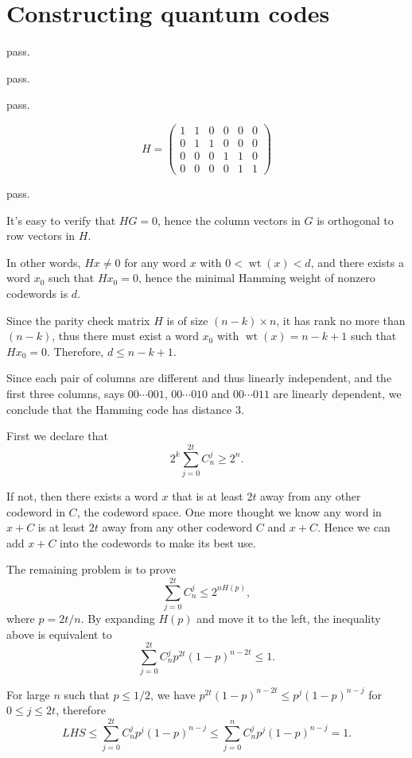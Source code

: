 \section{Constructing quantum codes}

\ex pass.

\ex pass.

\ex pass.

\ex $$H = \begin{pmatrix}
    1 & 1 & 0 & 0 & 0 & 0 \\
    0 & 1 & 1 & 0 & 0 & 0 \\
    0 & 0 & 0 & 1 & 1 & 0 \\
    0 & 0 & 0 & 0 & 1 & 1
\end{pmatrix}$$

\ex pass.

\ex It's easy to verify that $HG=0$, hence the column vectors in $G$ is orthogonal to row vectors in $H$.

\ex In other words, $Hx \neq 0$ for any word $x$ with $0 < \operatorname{wt}(x) < d$, and there exists a word $x_0$ such that $Hx_0=0$, hence the minimal Hamming weight of nonzero codewords is $d$.

\ex Since the parity check matrix $H$ is of size $(n-k)\times n$, it has rank no more than $(n-k)$, thus there must exist a word $x_0$ with $\operatorname{wt}(x)=n-k+1$ such that $Hx_0=0$.
Therefore, $d \le n-k+1$.

\ex Since each pair of columns are different and thus linearly independent, and the first three columns, says $00\cdots 001$, $00\cdots 010$ and $00\cdots 011$ are linearly dependent, we conclude that the Hamming code has distance 3.

\ex First we declare that
$$
2^k \sum_{j=0}^{2t}C_n^j \ge 2^n.
$$

If not, then there exists a word $x$ that is at least $2t$ away from any other codeword in $C$, the codeword space.
One more thought we know any word in $x+C$ is at least $2t$ away from any other codeword $C$ and $x+C$.
Hence we can add $x+C$ into the codewords to make its best use.

The remaining problem is to prove
$$
\sum_{j=0}^{2t}C_n^j \le 2^{nH(p)},
$$
where $p=2t/n$.
By expanding $H(p)$ and move it to the left, the inequality above is equivalent to
$$
\sum_{j=0}^{2t}C_n^j p^{2t} (1-p)^{n-2t} \le 1.
$$

For large $n$ such that $p\le 1/2$, we have $p^{2t} (1-p)^{n-2t} \le p^j(1-p)^{n-j}$ for $0\le j\le 2t$, therefore
$$
LHS \le \sum_{j=0}^{2t}C_n^j p^j (1-p)^{n-j} \le \sum_{j=0}^nC_n^j p^j (1-p)^{n-j} = 1.
$$

